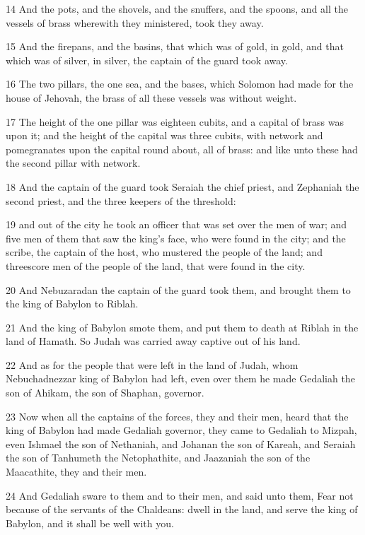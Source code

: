 \par 14 And the pots, and the shovels, and the snuffers, and the spoons, and all the vessels of brass wherewith they ministered, took they away.
\par 15 And the firepans, and the basins, that which was of gold, in gold, and that which was of silver, in silver, the captain of the guard took away.
\par 16 The two pillars, the one sea, and the bases, which Solomon had made for the house of Jehovah, the brass of all these vessels was without weight.
\par 17 The height of the one pillar was eighteen cubits, and a capital of brass was upon it; and the height of the capital was three cubits, with network and pomegranates upon the capital round about, all of brass: and like unto these had the second pillar with network.
\par 18 And the captain of the guard took Seraiah the chief priest, and Zephaniah the second priest, and the three keepers of the threshold:
\par 19 and out of the city he took an officer that was set over the men of war; and five men of them that saw the king's face, who were found in the city; and the scribe, the captain of the host, who mustered the people of the land; and threescore men of the people of the land, that were found in the city.
\par 20 And Nebuzaradan the captain of the guard took them, and brought them to the king of Babylon to Riblah.
\par 21 And the king of Babylon smote them, and put them to death at Riblah in the land of Hamath. So Judah was carried away captive out of his land.
\par 22 And as for the people that were left in the land of Judah, whom Nebuchadnezzar king of Babylon had left, even over them he made Gedaliah the son of Ahikam, the son of Shaphan, governor.
\par 23 Now when all the captains of the forces, they and their men, heard that the king of Babylon had made Gedaliah governor, they came to Gedaliah to Mizpah, even Ishmael the son of Nethaniah, and Johanan the son of Kareah, and Seraiah the son of Tanhumeth the Netophathite, and Jaazaniah the son of the Maacathite, they and their men.
\par 24 And Gedaliah sware to them and to their men, and said unto them, Fear not because of the servants of the Chaldeans: dwell in the land, and serve the king of Babylon, and it shall be well with you.

